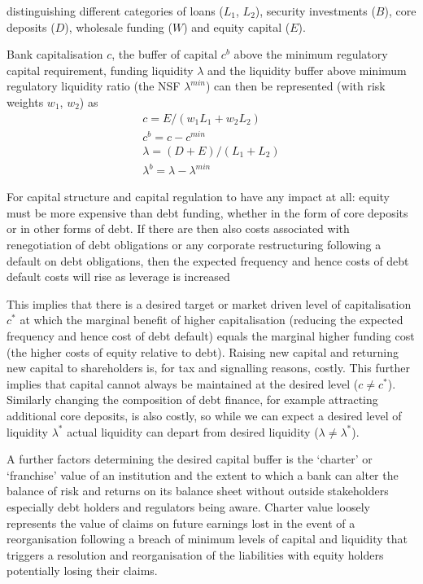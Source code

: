 \documentclass[
]{article}
\begin{document}
distinguishing different categories of loans (\(L_1\), \(L_2\)), security investments (\(B\)), core deposits (\(D\)), wholesale funding (\(W\)) and equity capital (\(E\)).

Bank capitalisation \(c\), the buffer of capital \(c^b\) above the minimum regulatory capital requirement, funding liquidity \(\lambda\) and the liquidity buffer above minimum regulatory liquidity ratio (the NSF \(\lambda^{min}\)) can then be represented (with risk weights \(w_1\), \(w_2\)) as
\[
\begin{split}
c=E/(w_1 L_1+ w_2 L_2)\\
c^b =c-c^{min}\\
\lambda =(D+E)/(L_1+L_2)\\
\lambda^{b}=\lambda-\lambda^{min}
\end{split}
\]

For capital structure and capital regulation to have any impact at all: equity must be more expensive than debt funding, whether in the form of core deposits or in other forms of debt. If there are then also costs associated with renegotiation of debt obligations or any corporate restructuring following a default on debt obligations, then the expected frequency and hence costs of debt default costs will rise as leverage is increased

This implies that there is a desired target or market driven level of capitalisation \(c^\ast\) at which the marginal benefit of higher capitalisation (reducing the expected frequency and hence cost of debt default) equals the marginal higher funding cost (the higher costs of equity relative to debt). Raising new capital and returning new capital to shareholders is, for tax and signalling reasons, costly. This further implies that capital cannot always be maintained at the desired level (\(c \neq c^\ast\)). Similarly changing the composition of debt finance, for example attracting additional core deposits, is also costly, so while we can expect a desired level of liquidity \(\lambda^\ast\) actual liquidity can depart from desired liquidity (\(\lambda \neq \lambda^\ast\)).

A further factors determining the desired capital buffer is the `charter' or `franchise' value of an institution and the extent to which a bank can alter the balance of risk and returns on its balance sheet without outside stakeholders especially debt holders and regulators being aware. Charter value loosely represents the value of claims on future earnings lost in the event of a reorganisation following a breach of minimum levels of capital and liquidity that triggers a resolution and reorganisation of the liabilities with equity holders potentially losing their claims.
\end{document}
